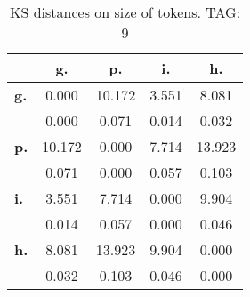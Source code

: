 \begin{table}[h!]
\begin{center}
\begin{tabular}{| l || c | c | c | c |}\hline
 & {\bf g.} & {\bf p.} & {\bf i.} & {\bf h.} \\\hline\hline
{\bf g.} & 0.000 & 10.172 & 3.551 & 8.081 \\
{\bf } & 0.000 & 0.071 & 0.014 & 0.032 \\\hline
{\bf p.} & 10.172 & 0.000 & 7.714 & 13.923 \\
{\bf } & 0.071 & 0.000 & 0.057 & 0.103 \\\hline
{\bf i.} & 3.551 & 7.714 & 0.000 & 9.904 \\
{\bf } & 0.014 & 0.057 & 0.000 & 0.046 \\\hline
{\bf h.} & 8.081 & 13.923 & 9.904 & 0.000 \\
{\bf } & 0.032 & 0.103 & 0.046 & 0.000 \\\hline
\end{tabular}
\caption{KS distances on size of tokens. TAG: 9}
\end{center}
\end{table}
